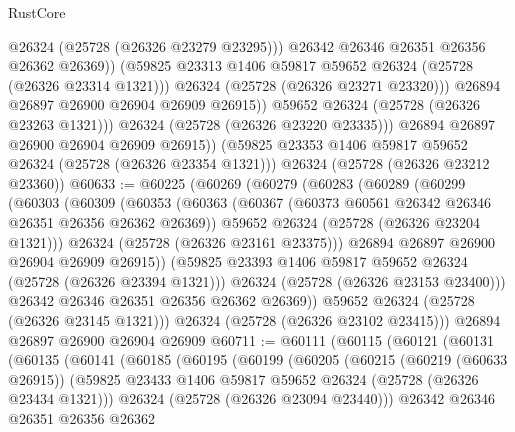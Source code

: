 \begin{lexlean}{RustCore}
\begin{coremodule}
                        @26324
                        (@25728 (@26326 @23279 @23295)))
                      @26342
                      @26346
                      @26351
                      @26356
                      @26362
                      @26369))
                  (@59825 @23313 @1406 @59817 @59652 @26324 (@25728 (@26326 @23314 @1321)))
                  @26324
                  (@25728 (@26326 @23271 @23320)))
                @26894
                @26897
                @26900
                @26904
                @26909
                @26915))
            @59652
            @26324
            (@25728 (@26326 @23263 @1321)))
          @26324
          (@25728 (@26326 @23220 @23335)))
        @26894
        @26897
        @26900
        @26904
        @26909
        @26915))
    (@59825 @23353 @1406 @59817 @59652 @26324 (@25728 (@26326 @23354 @1321)))
    @26324
    (@25728 (@26326 @23212 @23360))
@60633 := @60225
    (@60269
      (@60279
        (@60283
          (@60289
            (@60299
              (@60303
                (@60309
                  (@60353
                    (@60363
                      (@60367 (@60373 @60561 @26342 @26346 @26351 @26356 @26362 @26369))
                      @59652
                      @26324
                      (@25728 (@26326 @23204 @1321)))
                    @26324
                    (@25728 (@26326 @23161 @23375)))
                  @26894
                  @26897
                  @26900
                  @26904
                  @26909
                  @26915))
              (@59825 @23393 @1406 @59817 @59652 @26324 (@25728 (@26326 @23394 @1321)))
              @26324
              (@25728 (@26326 @23153 @23400)))
            @26342
            @26346
            @26351
            @26356
            @26362
            @26369))
        @59652
        @26324
        (@25728 (@26326 @23145 @1321)))
      @26324
      (@25728 (@26326 @23102 @23415)))
    @26894
    @26897
    @26900
    @26904
    @26909
@60711 := @60111
    (@60115
      (@60121
        (@60131
          (@60135
            (@60141
              (@60185
                (@60195
                  (@60199
                    (@60205
                      (@60215
                        (@60219 (@60633 @26915))
                        (@59825 @23433 @1406 @59817 @59652 @26324 (@25728 (@26326 @23434 @1321)))
                        @26324
                        (@25728 (@26326 @23094 @23440)))
                      @26342
                      @26346
                      @26351
                      @26356
                      @26362

\end{coremodule}
\end{lexlean}
